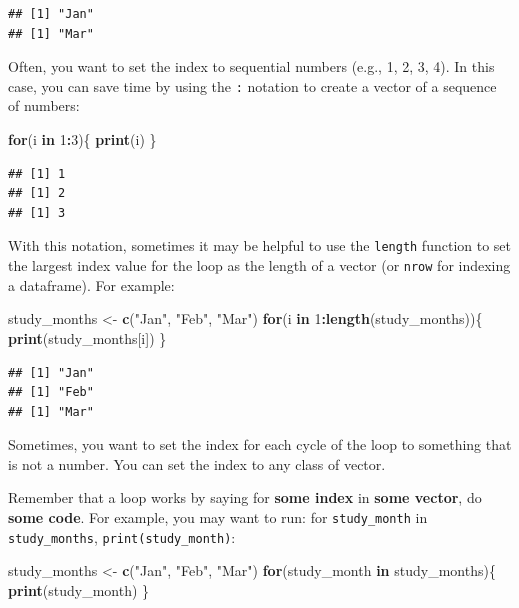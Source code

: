 \documentclass[]{book}
\makeatletter
\newenvironment{Shaded}{\begin{snugshade}}{\end{snugshade}}
\newcommand{\KeywordTok}[1]{\textcolor[rgb]{0.13,0.29,0.53}{\textbf{#1}}}
\newcommand{\DecValTok}[1]{\textcolor[rgb]{0.00,0.00,0.81}{#1}}
\newcommand{\StringTok}[1]{\textcolor[rgb]{0.31,0.60,0.02}{#1}}
\newcommand{\ControlFlowTok}[1]{\textcolor[rgb]{0.13,0.29,0.53}{\textbf{#1}}}
\newcommand{\OperatorTok}[1]{\textcolor[rgb]{0.81,0.36,0.00}{\textbf{#1}}}
\newcommand{\NormalTok}[1]{#1}
\newenvironment{kframe}{%
\medskip{}
\setlength{\fboxsep}{.8em}
 \def\at@end@of@kframe{}%
 \ifinner\ifhmode%
  \def\at@end@of@kframe{\end{minipage}}%
  \begin{minipage}{\columnwidth}%
 \fi\fi%
 \def\FrameCommand##1{\hskip\@totalleftmargin \hskip-\fboxsep
 \colorbox{shadecolor}{##1}\hskip-\fboxsep
     \hskip-\linewidth \hskip-\@totalleftmargin \hskip\columnwidth}%
 \MakeFramed {\advance\hsize-\width
   \@totalleftmargin\z@ \linewidth\hsize
   \@setminipage}}%
 {\par\unskip\endMakeFramed%
 \at@end@of@kframe}
\renewenvironment{Shaded}{\begin{kframe}}{\end{kframe}}
\theoremstyle{definition}
\theoremstyle{definition}
\theoremstyle{definition}
\theoremstyle{remark}
\makeatother
\begin{document}
\begin{verbatim}
## [1] "Jan"
## [1] "Mar"
\end{verbatim}

Often, you want to set the index to sequential numbers (e.g., 1, 2, 3,
4). In this case, you can save time by using the \texttt{:} notation to
create a vector of a sequence of numbers:

\begin{Shaded}
\begin{Highlighting}[]
\ControlFlowTok{for}\NormalTok{(i }\ControlFlowTok{in} \DecValTok{1}\OperatorTok{:}\DecValTok{3}\NormalTok{)\{}
        \KeywordTok{print}\NormalTok{(i)}
\NormalTok{\}}
\end{Highlighting}
\end{Shaded}

\begin{verbatim}
## [1] 1
## [1] 2
## [1] 3
\end{verbatim}

With this notation, sometimes it may be helpful to use the
\texttt{length} function to set the largest index value for the loop as
the length of a vector (or \texttt{nrow} for indexing a dataframe). For
example:

\begin{Shaded}
\begin{Highlighting}[]
\NormalTok{study_months <-}\StringTok{ }\KeywordTok{c}\NormalTok{(}\StringTok{"Jan"}\NormalTok{, }\StringTok{"Feb"}\NormalTok{, }\StringTok{"Mar"}\NormalTok{)}
\ControlFlowTok{for}\NormalTok{(i }\ControlFlowTok{in} \DecValTok{1}\OperatorTok{:}\KeywordTok{length}\NormalTok{(study_months))\{}
        \KeywordTok{print}\NormalTok{(study_months[i])}
\NormalTok{\}}
\end{Highlighting}
\end{Shaded}

\begin{verbatim}
## [1] "Jan"
## [1] "Feb"
## [1] "Mar"
\end{verbatim}

Sometimes, you want to set the index for each cycle of the loop to
something that is not a number. You can set the index to any class of
vector.

Remember that a loop works by saying for \textbf{some index} in
\textbf{some vector}, do \textbf{some code}. For example, you may want
to run: for \texttt{study\_month} in \texttt{study\_months},
\texttt{print(study\_month)}:

\begin{Shaded}
\begin{Highlighting}[]
\NormalTok{study_months <-}\StringTok{ }\KeywordTok{c}\NormalTok{(}\StringTok{"Jan"}\NormalTok{, }\StringTok{"Feb"}\NormalTok{, }\StringTok{"Mar"}\NormalTok{)}
\ControlFlowTok{for}\NormalTok{(study_month }\ControlFlowTok{in}\NormalTok{ study_months)\{}
        \KeywordTok{print}\NormalTok{(study_month)}
\NormalTok{\}}
\end{Highlighting}
\end{Shaded}
\end{document}
